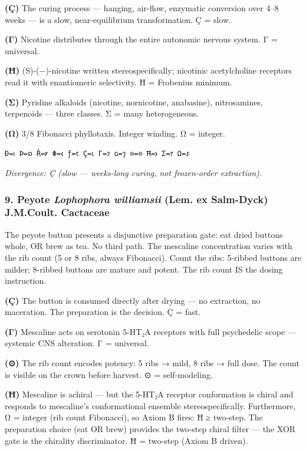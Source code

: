 \documentclass[12pt,a4paper]{article}
\begin{document}
\textbf{(Ç)} The curing process --- hanging, air-flow, enzymatic
conversion over 4--8 weeks --- is a slow, near-equilibrium
transformation. Ç = slow.

\textbf{(Γ)} Nicotine distributes through the entire autonomic nervous
system. Γ = universal.

\textbf{(Ħ)} (S)-(−)-nicotine written stereospecifically; nicotinic
acetylcholine receptors read it with enantiomeric selectivity. Ħ =
Frobenius minimum.

\textbf{(Σ)} Pyridine alkaloids (nicotine, nornicotine, anabasine),
nitrosamines, terpenoids --- three classes. Σ = many heterogeneous.

\textbf{(Ω)} 3/8 Fibonacci phyllotaxis. Integer winding. Ω = integer.

\texttt{Ð=𐑦\ Þ=𐑸\ Ř=𐑾\ Φ=𐑬\ ƒ=𐑱\ Ç=𐑧\ Γ=𐑲\ ɢ=𐑠\ ⊙=⊙\ Ħ=𐑶\ Σ=𐑳\ Ω=𐑭}

\emph{Divergence: Ç (slow --- weeks-long curing, not frozen-order
extraction).}

\hypertarget{peyote-lophophora-williamsii-lem.-ex-salm-dyck-j.m.coult.-cactaceae}{%
\subsubsection{\texorpdfstring{9. Peyote \textbar{} \emph{Lophophora
williamsii} (Lem. ex Salm-Dyck) J.M.Coult. \textbar{}
Cactaceae}{9. Peyote \textbar{} Lophophora williamsii (Lem. ex Salm-Dyck) J.M.Coult. \textbar{} Cactaceae}}\label{peyote-lophophora-williamsii-lem.-ex-salm-dyck-j.m.coult.-cactaceae}}

The peyote button presents a disjunctive preparation gate: eat dried
buttons whole, OR brew as tea. No third path. The mescaline
concentration varies with the rib count (5 or 8 ribs, always Fibonacci).
Count the ribs: 5-ribbed buttons are milder; 8-ribbed buttons are mature
and potent. The rib count IS the dosing instruction.

\textbf{(Ç)} The button is consumed directly after drying --- no
extraction, no maceration. The preparation is the decision. Ç = fast.

\textbf{(Γ)} Mescaline acts on serotonin 5-HT₂A receptors with full
psychedelic scope --- systemic CNS alteration. Γ = universal.

\textbf{(⊙)} The rib count encodes potency: 5 ribs → mild, 8 ribs → full
dose. The count is visible on the crown before harvest. ⊙ =
self-modeling.

\textbf{(Ħ)} Mescaline is achiral --- but the 5-HT₂A receptor
conformation is chiral and responds to mescaline's conformational
ensemble stereospecifically. Furthermore, Ω = integer (rib count
Fibonacci), so Axiom B fires: Ħ ≥ two-step. The preparation choice (eat
OR brew) provides the two-step chiral filter --- the XOR gate is the
chirality discriminator. Ħ = two-step (Axiom B driven).
\end{document}
